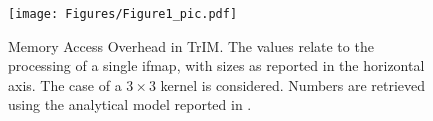 \begin{figure}
\texttt{[image: Figures/Figure1\_pic.pdf]}
\centering
\caption{Memory Access Overhead in TrIM\cite{Sestito_24_1}. The values relate to the processing of a single ifmap, with sizes as reported in the horizontal axis. The case of a $3 \times 3$ kernel is considered. Numbers are retrieved using the analytical model reported in \cite{Sestito_24_1}.
}
\label{MemAccOv_TrIM}
\end{figure}